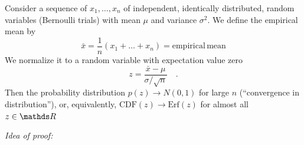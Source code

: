 \documentclass{notebook}
\begin{document}
\begin{theorem}
	Consider a sequence of $x_1, \dots, x_n$ of independent, identically distributed, random variables (Bernoulli trials) with mean $\mu$ and variance $\sigma^2$. We define the empirical mean by
	\begin{equation}
	\bar{x} = \frac{1}{n}(x_1 + \dots + x_n) = \mathrm{empirical \, mean}
	\end{equation}
	We normalize it to a random variable with expectation value zero
	\begin{equation}
	z = \frac{\bar{x}-\mu}{\sigma/\sqrt{n}} \quad.
	\end{equation}
	Then the probability distribution $p(z) \to N(0,1)$ for large $n$ (``convergence in distribution''), or, equivalently, $\mathrm{CDF}(z) \to \mathrm{Erf}(z)$ for almost all $z \in \R$	
\end{theorem}




\textit{Idea of proof:}
\end{document}
